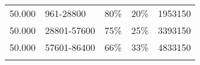 \documentclass[11pt,a4paperpaper,]{report}
\begin{document}
\begin{longtable}[c]{@{}lllcl@{}}
\begin{minipage}[t]{0.16\columnwidth}\raggedright\strut
50.000
\strut\end{minipage} &
\begin{minipage}[t]{0.19\columnwidth}\raggedright\strut
961-28800
\strut\end{minipage} &
\begin{minipage}[t]{0.10\columnwidth}\raggedright\strut
80\%
\strut\end{minipage} &
\begin{minipage}[t]{0.10\columnwidth}\centering\strut
20\%
\strut\end{minipage} &
\begin{minipage}[t]{0.16\columnwidth}\raggedright\strut
1953150
\strut\end{minipage}\tabularnewline
\begin{minipage}[t]{0.16\columnwidth}\raggedright\strut
50.000
\strut\end{minipage} &
\begin{minipage}[t]{0.19\columnwidth}\raggedright\strut
28801-57600
\strut\end{minipage} &
\begin{minipage}[t]{0.10\columnwidth}\raggedright\strut
75\%
\strut\end{minipage} &
\begin{minipage}[t]{0.10\columnwidth}\centering\strut
25\%
\strut\end{minipage} &
\begin{minipage}[t]{0.16\columnwidth}\raggedright\strut
3393150
\strut\end{minipage}\tabularnewline
\begin{minipage}[t]{0.16\columnwidth}\raggedright\strut
50.000
\strut\end{minipage} &
\begin{minipage}[t]{0.19\columnwidth}\raggedright\strut
57601-86400
\strut\end{minipage} &
\begin{minipage}[t]{0.10\columnwidth}\raggedright\strut
66\%
\strut\end{minipage} &
\begin{minipage}[t]{0.10\columnwidth}\centering\strut
33\%
\strut\end{minipage} &
\begin{minipage}[t]{0.16\columnwidth}\raggedright\strut
4833150
\strut\end{minipage}\tabularnewline
\begin{minipage}[t]{0.16\columnwidth}\raggedright\strut

\end{minipage}
\end{longtable}
\end{document}
